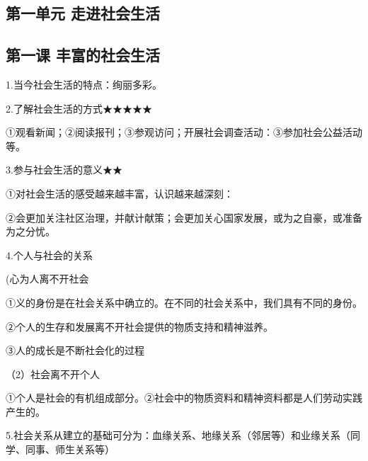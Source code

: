 \documentclass[lang=cn,11pt]{elegantbook}
\newcommand{\daofasym}[1]{{\daofasymbolfont #1}}
\newcommand{\daofasym}[1]{#1}
\begin{document}
\subsection*{第一单元 走进社会生活}

\subsection*{第一课 丰富的社会生活}

1.当今社会生活的特点：绚丽多彩。\par

2.了解社会生活的方式\daofasym{★}\daofasym{★}\daofasym{★}\daofasym{★}\daofasym{★}\par

\daofasym{①}观看新闻；\daofasym{②}阅读报刊；\daofasym{③}参观访问；开展社会调查活动：\daofasym{③}参加社会公益活动等。\par

3.参与社会生活的意义\daofasym{★}\daofasym{★}\par

\daofasym{①}对社会生活的感受越来越丰富，认识越来越深刻：\par

\daofasym{②}会更加关注社区治理，并献计献策；会更加关心国家发展，或为之自豪，或准备为之分忧。\par

4.个人与社会的关系\par

(心为人离不开社会\par

\daofasym{①}义的身份是在社会关系中确立的。在不同的社会关系中，我们具有不同的身份。\par

\daofasym{②}个人的生存和发展离不开社会提供的物质支持和精神滋养。\par

\daofasym{③}人的成长是不断社会化的过程\par

（2）社会离不开个人\par

\daofasym{①}个人是社会的有机组成部分。\daofasym{②}社会中的物质资料和精神资料都是人们劳动实践产生的。\par

5.社会关系从建立的基础可分为：血缘关系、地缘关系（邻居等）和业缘关系（同学、同事、师生关系等）\par
\end{document}
